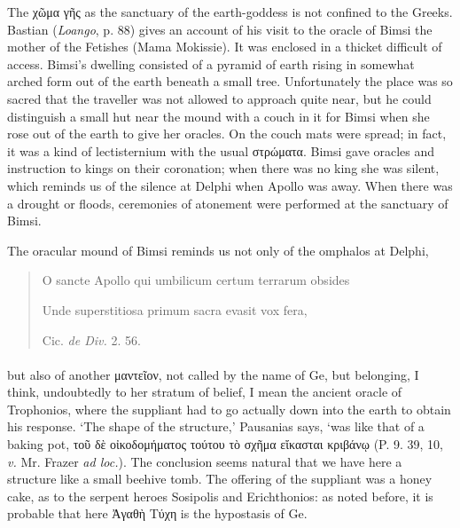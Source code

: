 \documentclass[a4paper, 11pt, oneside, polutonikogreek, english]{article}
\begin{document}
The χῶμα γῆς as the sanctuary of the earth-goddess is not confined to the Greeks. Bastian (\emph{Loango}, p. 88) gives an account of his visit to the oracle of Bimsi the mother of the Fetishes (Mama Mokissie). It was enclosed in a thicket difficult of access. Bimsi's dwelling consisted of a pyramid of earth rising in somewhat arched form out of the earth beneath a small tree. Unfortunately the place was so sacred that the traveller was not allowed to approach quite near, but he could distinguish a small hut near the mound with a couch in it for Bimsi when she rose out of the earth to give her oracles. On the couch mats were spread; in fact, it was a kind of lectisternium with the usual στρώματα. Bimsi gave oracles and instruction to kings on their coronation; when there was no king she was silent, which reminds us of the silence at Delphi when Apollo was away. When there was a drought or floods, ceremonies of atonement were performed at the sanctuary of Bimsi.

The oracular mound of Bimsi reminds us not only of the omphalos at Delphi,
\begin{quotation}
\large
O sancte Apollo qui umbilicum certum terrarum obsides

Unde superstitiosa primum sacra evasit vox fera,

\hspace*{20mm}Cic. \emph{de Div.} 2. 56.
\end{quotation}
\paragraph{}
but also of another μαντεῖον, not called by the name of Ge, but belonging, I think, undoubtedly to her stratum of belief, I mean the ancient oracle of Trophonios, where the suppliant had to go actually down into the earth to obtain his response. `The shape of the structure,' Pausanias says, `was like that of a baking pot, τοῦ δὲ οἰκοδομήματος τούτου τὸ σχῆμα εἴκασται κριβάνῳ (P. 9. 39, 10, \emph{v.} Mr. Frazer \emph{ad loc.}). The conclusion seems natural that we have here a structure like a small beehive tomb. The offering of the suppliant was a honey cake, as to the serpent heroes Sosipolis and Erichthonios: as noted before, it is probable that here Ἀγαθὴ Τύχη is the hypostasis of Ge.
\end{document}

